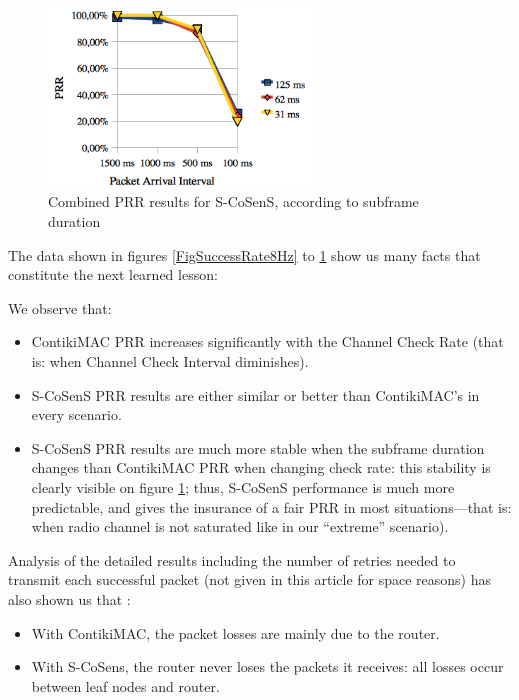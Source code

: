 \documentclass[12pt,a4paper]{article}
\begin{document}
\begin{figure}[tbph]
  \centering
  \includegraphics[width=7cm]{graphes/PRRstabilitySCoSenS.png}
  \caption{Combined PRR results for S-CoSenS,
           according to subframe duration}
  \label{FigSuccessRateSCoSenS}
\end{figure}

The data shown in figures \ref{FigSuccessRate8Hz} to
\ref{FigSuccessRateSCoSenS} show us many facts that constitute
the next learned lesson:

\begin{observ}
We observe that:
\begin{itemize}
\item ContikiMAC PRR increases significantly with the Channel Check Rate
      (that is: when Channel Check Interval diminishes).
\item S-CoSenS PRR results are either similar or better than ContikiMAC's
      in every scenario.
\item S-CoSenS PRR results are much more stable when the subframe duration
      changes than ContikiMAC PRR when changing check rate: this stability
      is clearly visible on figure \ref{FigSuccessRateSCoSenS}; thus,
      S-CoSenS performance is much more predictable, and gives
      the insurance of a fair PRR in most situations---that is:
      when radio channel is not saturated like in our ``extreme''
      scenario).
\end{itemize}
\end{observ}

Analysis of the detailed results including the number of retries needed
to transmit each successful packet (not given in this article for space
reasons) has also shown us that :

\begin{itemize}

\item With ContikiMAC, the packet losses are mainly due to the router.

\item With S-CoSens, the router never loses the packets it receives:
      all losses occur between leaf nodes and router.

\end{itemize}
\end{document}
